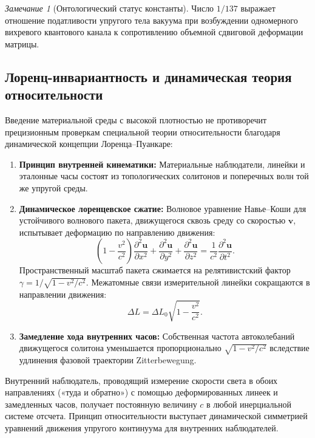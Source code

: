 \documentclass[11pt,a4paper]{article}
\theoremstyle{definition}
\theoremstyle{remark}
\newtheorem{remark}{Замечание}
\begin{document}
\begin{remark}[Онтологический статус константы]
Число $1/137$ выражает отношение податливости упругого тела вакуума при возбуждении одномерного вихревого квантового канала к сопротивлению объемной сдвиговой деформации матрицы.
\end{remark}
	
\subsection{Лоренц-инвариантность и динамическая теория относительности}
	
Введение материальной среды с высокой плотностью не противоречит прецизионным проверкам специальной теории относительности благодаря динамической концепции Лоренца--Пуанкаре:
	
\begin{enumerate}
	\item \textbf{Принцип внутренней кинематики:} Материальные наблюдатели, линейки и эталонные часы состоят из топологических солитонов и поперечных волн той же упругой среды.
	\item \textbf{Динамическое лоренцевское сжатие:} Волновое уравнение Навье--Коши для устойчивого волнового пакета, движущегося сквозь среду со скоростью $\mathbf{v}$, испытывает деформацию по направлению движения:
\begin{equation}
	\left(1 - \frac{v^2}{c^2}\right) \frac{\partial^2 \mathbf{u}}{\partial x^2} + \frac{\partial^2 \mathbf{u}}{\partial y^2} + \frac{\partial^2 \mathbf{u}}{\partial z^2} = \frac{1}{c^2} \frac{\partial^2 \mathbf{u}}{\partial t^2}.
	\label{eq:navier_cauchy_moving}
\end{equation}
Пространственный масштаб пакета сжимается на релятивистский фактор $\gamma = 1/\sqrt{1 - v^2/c^2}$. Межатомные связи измерительной линейки сокращаются в направлении движения:
\begin{equation}
	\Delta L = \Delta L_0 \sqrt{1 - \frac{v^2}{c^2}}.
	\label{eq:lorentz_length_contraction}
\end{equation}
\item \textbf{Замедление хода внутренних часов:} Собственная частота автоколебаний движущегося солитона уменьшается пропорционально $\sqrt{1 - v^2/c^2}$ вследствие удлинения фазовой траектории Zitterbewegung.
\end{enumerate}
	
	Внутренний наблюдатель, проводящий измерение скорости света в обоих направлениях («туда и обратно») с помощью деформированных линеек и замедленных часов, получает постоянную величину $c$ в любой инерциальной системе отсчета. Принцип относительности выступает динамической симметрией уравнений движения упругого континуума для внутренних наблюдателей.
	
\end{document}
